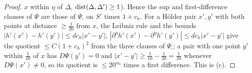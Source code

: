 \begin{proof}
$x$ within $\eta$ of $\Delta$, $\operatorname{dist}(\Delta,\Delta')\ge1$). Hence the sup and first-difference clauses of $\Psi$ are those of $\Psi_\square$ on $S'$ times $1+c_h$. For a H\"older pair $x',y'$ with both points at distance $\ge\frac1{20}$ from $x$, the Leibniz rule and the bounds $|h'(x')-h'(y')|\le dc_h|x'-y'|$, $|\partial^\eta h'(x')-\partial^\eta h'(y')|\le dc_h|x'-y'|$ give the quotient $\le C(1+c_h)^2$ from the three clauses of $\Psi_\square$; a pair with one point $y'$ within $\frac1{20}$ of $x$ has $D\Psi(y')=0$ and $|x'-y'|\ge\frac1{10}-\frac1{20}=\frac1{20}$ whenever $D\Psi(x')\ne0$, so its quotient is $\le20^{\alpha_0}$ times a first difference. This is (c).
\end{proof}
